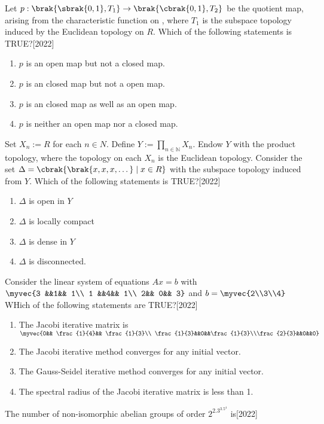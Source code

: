 \item Let $p:\brak{\sbrak{0,1},T_1}\rightarrow\brak{\cbrak{0,1},T_2}$ be the quotient map, arising from the characteristic function on , where $T_1$ is the subspace topology induced by the Euclidean topology on $R$. Which of the following statements is TRUE?\hfill{[2022]}
\begin{enumerate}
    \item $p$ is an open map but not a closed map.
    \item $p$ is an closed map but not a open map.
    \item $p$ is an closed map as well as an open map.
    \item $p$ is neither an open map nor a closed map.
\end{enumerate}
\item Set $X_n:=R$ for each $n\in N$. Define $Y:=\prod\limits_{n \in \mathbb{N}} X_n$. Endow $Y$ with the product topology, where the topology on each $X_n$ is the Euclidean topology. Consider the set $\Delta=\cbrak{\brak{x,x,x,\dots}\mid x\in R}$ with the subspace topology induced from $Y$. Which of the following statements is TRUE?\hfill{[2022]}
\begin{enumerate}
     \item  $\Delta$ is open in $Y$\\
     \item  $\Delta$ is locally compact\\
     \item  $\Delta$ is dense in $Y$\\
     \item  $\Delta$ is disconnected.
 \end{enumerate}

\item Consider the linear system of equations $Ax=b$ with $\myvec{3 &&1&& 1\\ 1 &&4&& 1\\ 2&& 0&& 3}$ and $b=\myvec{2\\3\\4}$ WHich of the following statements are TRUE?\hfill{[2022]}
\begin{enumerate}
    \item The Jacobi iterative matrix is $\myvec{0&& \frac{1}{4}&& \frac{1}{3}\\ \frac{1}{3}&&0&&\frac{1}{3}\\\frac{2}{3}&&0&&0}$
    \item The Jacobi iterative method converges for any initial vector.
    \item The Gauss-Seidel iterative method converges for any initial vector.
    \item The spectral radius of the Jacobi iterative matrix is less than 1.
\end{enumerate}
\item The number of non-isomorphic abelian groups of order $2^2.3^3.5^4$ is\hfill{[2022]}




